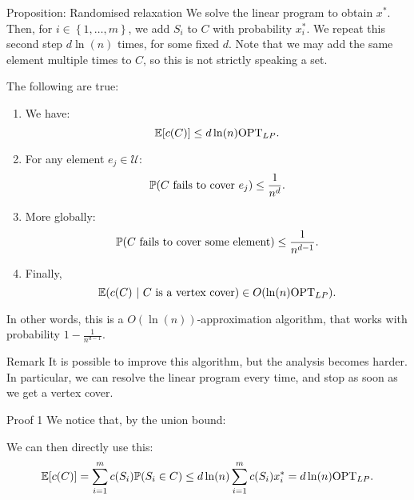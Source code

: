\documentclass[a4paper]{article}
\begin{document}
\begin{parag}{Proposition: Randomised relaxation}
    We solve the linear program to obtain $x^*$. Then, for $i \in \left\{1, \ldots, m\right\}$, we add $S_i$ to $C$ with probability $x_i^*$. We repeat this second step $d \ln\left(n\right)$ times, for some fixed $d$. Note that we may add the same element multiple times to $C$, so this is not strictly speaking a set.

    The following are true:
    \begin{enumerate}
        \item We have:
    \[\exval\left[c\left(C\right)\right] \leq d\ln\left(n\right) \text{OPT}_{LP}.\]
        \item For any element $e_j \in \mathcal{U}$: 
        \[\prob\left(\text{$C$ fails to cover $e_j$}\right) \leq \frac{1}{n^d}.\]
        \item More globally:
        \[\prob\left(\text{$C$ fails to cover some element}\right) \leq \frac{1}{n^{d-1}}.\]
        \item Finally, 
        \[\exval\left(c\left(C\right) \suchthat \text{$C$ is a vertex cover}\right) \in O\left(\ln\left(n\right) \text{OPT}_{LP}\right).\]
    \end{enumerate}

    In other words, this is a $O\left(\ln\left(n\right)\right)$-approximation algorithm, that works with probability $1 - \frac{1}{n^{d-1}}$.

    \begin{subparag}{Remark}
        It is possible to improve this algorithm, but the analysis becomes harder. In particular, we can resolve the linear program every time, and stop as soon as we get a vertex cover.
    \end{subparag}

    \begin{subparag}{Proof 1}
        We notice that, by the union bound: 
        
        We can then directly use this:
        \[\exval\left[c\left(C\right)\right] = \sum_{i=1}^{m} c\left(S_i\right)\prob\left(S_i \in C\right) \leq d \ln\left(n\right) \sum_{i=1}^{m} c\left(S_i\right) x_i^* = d \ln\left(n\right) \text{OPT}_{LP}.\]
    \end{subparag}


\end{parag}
\end{document}
